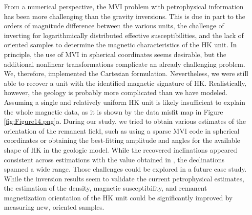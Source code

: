 \documentclass[paper, twocolumn]{geophysics} %
\begin{document}
From a numerical perspective, the MVI problem with petrophysical information has been more challenging than the gravity inversions. This is due in part to the orders of magnitude difference between the various units, the challenge of inverting for logarithmically distributed effective susceptibilities, and the lack of oriented samples to determine the magnetic characteristics of the HK unit. In principle, the use of MVI in spherical coordinates seems desirable, but the additional nonlinear transformations complicate an already challenging problem. We, therefore, implemented the Cartesian formulation. Nevertheless, we were still able to recover a unit with the identified magnetic signature of HK. Realistically, however, the geology is probably more complicated than we have modeled. Assuming a single and relatively uniform HK unit is likely insufficient to explain the whole magnetic data, as it is shown by the data misfit map in Figure \ref{fig:Figure14.png}a. During our study, we tried to obtain various estimates of the orientation of the remanent field, such as using a sparse MVI code in spherical coordinates \citep{SparseNorms2} or obtaining the best-fitting amplitude and angles for the available shape of HK in the geologic model. While the recovered inclinations appeared consistent across estimations with the value obtained in \citet{TKCpaper}, the declinations spanned a wide range. Those challenges could be explored in a future case study. While the inversion results seem to validate the current petrophysical estimates, the estimation of the density, magnetic susceptibility, and remanent magnetization orientation of the HK unit could be significantly improved by measuring new, oriented samples.

\end{document}

